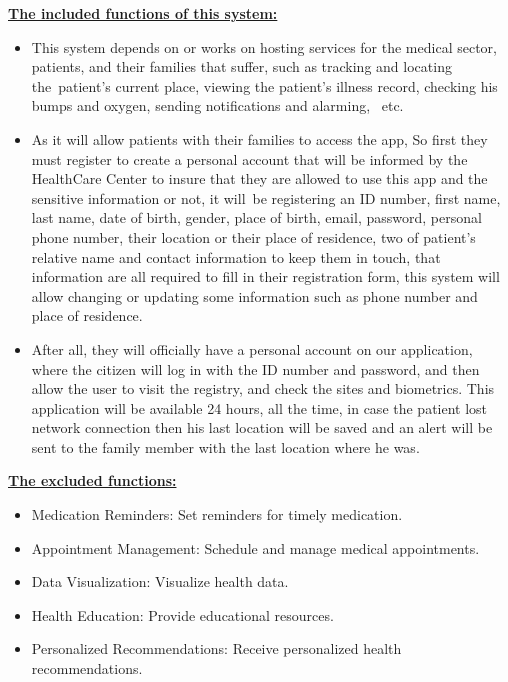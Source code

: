 \documentclass[12pt]{article}
\begin{document}
			
			\textbf{\underline{The included functions of this system: }}\\
			\begin{itemize}
				\item This system depends on or works on hosting services for the medical sector, patients, and their families that suffer, such as tracking and locating the patient's current place, viewing the patient’s illness record, checking his bumps and oxygen, sending notifications and alarming,  etc. 
				\item As it will allow patients with their families to access the app, So first they must register to create a personal account that will be informed by the HealthCare Center to insure that they are allowed to use this app and the sensitive information or not, it will be registering an ID number, first name, last name, date of birth, gender, place of birth, email, password, personal phone number, their location or their place of residence, two of patient’s relative name and contact information to keep them in touch, that information are all required to fill in their registration form, this system will allow changing or updating some information such as phone number and place of residence. 
				\item After all, they will officially have a personal account on our application, where the citizen will log in with the ID number and password, and then allow the user to visit the registry, and check the sites and biometrics. 
				This application will be available 24 hours, all the time, in case the patient lost network connection then his last location will be saved and an alert will be sent to the family member  with the last location where he was.
			\end{itemize}
		
			\begin{center}
			\end{center}
			\textbf{\underline{The excluded functions:}} \\
			\begin{itemize}
				\item Medication Reminders: Set reminders for timely medication.
				\item Appointment Management: Schedule and manage medical appointments.
				\item Data Visualization: Visualize health data.
				\item Health Education: Provide educational resources.
				\item Personalized Recommendations: Receive personalized health recommendations.
				
			\end{itemize}
			 
\end{document}
